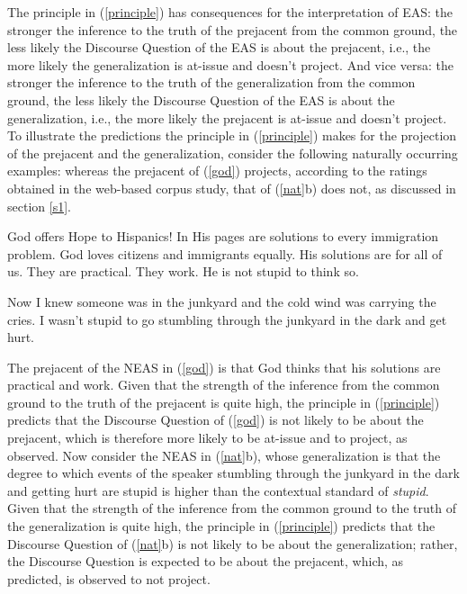 \documentclass[11pt,fleqn]{article}
\newcommand{\6}{\mbox{$[\hspace*{-.6mm}[$}}
\newcommand{\9}{\mbox{$]\hspace*{-.6mm}]$}}
\begin{document}
The principle in (\ref{principle}) has consequences for the interpretation of EAS: the stronger the inference to the truth of the prejacent from the common ground, the less likely the Discourse Question of the EAS is about the prejacent, i.e., the more likely the generalization is at-issue and doesn't project. And vice versa: the stronger the inference to the truth of the generalization from the common ground, the less likely the Discourse Question of the EAS is about the generalization, i.e., the more likely the prejacent is at-issue and doesn't project. To illustrate the predictions the principle in (\ref{principle}) makes for the projection of the prejacent and the generalization, consider the following naturally occurring examples: whereas the prejacent of (\ref{god}) projects, according to the ratings obtained in the web-based corpus study, that of (\ref{nat}b) does not, as discussed in section \ref{s1}.

\begin{exe}

\ex\label{god} God offers Hope to Hispanics! In His pages are solutions to every immigration problem. God loves citizens and immigrants equally. His solutions are for all of us. They are practical. They work. He is not stupid to think so.

  Now I knew someone was in the junkyard and the cold wind was
carrying the cries. I wasn't stupid to go stumbling through the
junkyard in the dark and get hurt.

\end{exe}
The prejacent of the NEAS in (\ref{god}) is that God thinks that his solutions are practical and work. Given that the strength of the inference from the common ground to the truth of the prejacent is quite high, the principle in (\ref{principle}) predicts that the Discourse Question of (\ref{god}) is not likely to be about the prejacent, which is therefore more likely to be at-issue and to project, as observed. Now consider the NEAS in (\ref{nat}b), whose generalization is that the degree to which events of the speaker stumbling through the junkyard in the dark and getting hurt are stupid is higher than the contextual standard of {\em stupid}. Given that the strength of the inference from the common ground to the truth of the generalization is quite high, the principle in (\ref{principle}) predicts that the Discourse Question of (\ref{nat}b) is not likely to be about the generalization; rather, the Discourse Question is expected to be about the prejacent, which, as predicted, is observed to not project. 
\end{document}

